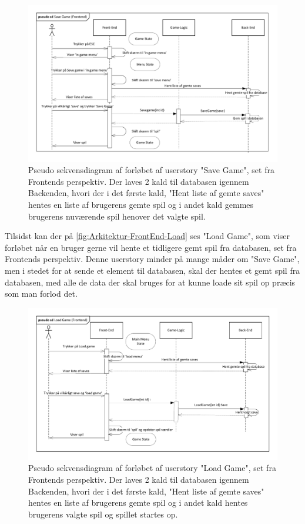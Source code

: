 \begin{figure}[h]
\centering
\includegraphics[width = \textwidth]{02-Body/Images/Front-End_-_Arkitektur-savegame.pdf}
\caption{Pseudo sekvensdiagram af forløbet af userstory "Save Game", set fra Frontends perspektiv. Der laves 2 kald til databasen igennem Backenden, hvori der i det første kald,  "Hent liste af gemte saves" hentes en liste af brugerens gemte spil og i andet kald gemmes brugerens nuværende spil henover det valgte spil.}
\label{fig:Arkitektur-FrontEnd-Save}
\end{figure}

\noindent Tilsidst kan der på \autoref{fig:Arkitektur-FrontEnd-Load} ses "Load Game", som viser forløbet når en bruger gerne vil hente et tidligere gemt spil fra databasen, set fra Frontends perspektiv. Denne userstory minder på mange måder om "Save Game", men i stedet for at sende et element til databasen, skal der hentes et gemt spil fra databasen, med alle de data der skal bruges for at kunne loade sit spil op præcis som man forlod det. \\

\begin{figure}[h]
\centering
\includegraphics[width = \textwidth]{02-Body/Images/Front-End_-_Arkitektur-loadgame.pdf}
\caption{Pseudo sekvensdiagram af forløbet af userstory "Load Game", set fra Frontends perspektiv. Der laves 2 kald til databasen igennem Backenden, hvori der i det første kald,  "Hent liste af gemte saves" hentes en liste af brugerens gemte spil og i andet kald hentes  brugerens valgte spil og spillet startes op.}
\label{fig:Arkitektur-FrontEnd-Load}
\end{figure}

\newpage
